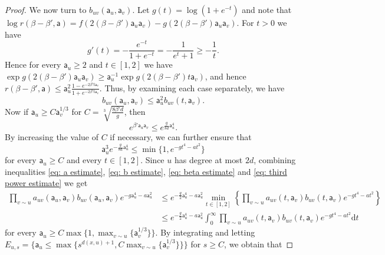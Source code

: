 \documentclass[10pt,a4paper]{amsart}
\begin{document}
\begin{proof}
We now turn to $b_{uv}(\mathsf{a}_u,\mathsf{a}_v)$. Let $g(t)=\log(1+e^{-t})$ and note that $\log r(\beta-\beta',\mathsf{a})=f(2(\beta-\beta')\mathsf{a}_u \mathsf{a}_v)-g(2(\beta-\beta')\mathsf{a}_u \mathsf{a}_v)$.
For $t>0$ we have
\begin{equation}
g'(t)=-\frac{e^{-t}}{1+e^{-t}}=-\frac{1}{e^t+1}\geq -\frac{1}{t}.   
\end{equation}
Hence for every $\mathsf{a}_u\geq 2$ and $t\in [1,2]$ we have 
$\exp g(2(\beta-\beta')\mathsf{a}_u \mathsf{a}_v)\geq \mathsf{a}_u^{-1} \exp g(2(\beta-\beta')t \mathsf{a}_v)$, and hence $r(\beta-\beta',\mathsf{a}) \leq \mathsf a_u^2 \frac{1-e^{-2\beta' t \mathsf a_v}}{1+e^{-2\beta' t \mathsf a_v}}.$
Thus, by examining each case separately, we have
\begin{equation}\label{eq: b estimate}
b_{uv}(\mathsf{a}_u,\mathsf{a}_v)\leq \mathsf{a}_u^2 b_{uv}(t,\mathsf{a}_v).    
\end{equation}
Now if $\mathsf{a}_u\geq C\mathsf{a}_v^{1/3}$ for $C=\sqrt[3]{\frac{8\beta' d}{g}}$, then
\begin{equation}\label{eq: beta estimate}
e^{\beta' \mathsf{a}_u \mathsf{a}_v}\leq e^{\frac{g}{8d}\mathsf{a}_u^4}.    
\end{equation}
By increasing the value of $C$ if necessary, we can further ensure that 
\begin{equation}\label{eq: third power estimate}
\mathsf{a}_u^3 e^{-\frac{g}{8d}\mathsf{a}_u^4}\leq \min\{1,e^{-gt^4-at^2} \}    
\end{equation}
for every $\mathsf{a}_u\geq C$ and every $t\in [1,2]$. Since $u$ has degree at most $2d$, combining inequalities \eqref{eq: a estimate}, \eqref{eq: b estimate}, \eqref{eq: beta estimate} and \eqref{eq: third power estimate} we get
\begin{equation}
\begin{aligned}
\prod_{v\sim u} a_{uv}(\mathsf{a}_u,\mathsf{a}_v)b_{uv}(\mathsf{a}_u,\mathsf{a}_v)e^{-g\mathsf{a}_u^4-a\mathsf{a}_u^2}&\leq e^{-\frac{g}{2}\mathsf{a}_u^4-a\mathsf{a}_u^2}\min_{t\in [1,2]}\left\{\prod_{v \sim u} a_{uv}(t,\mathsf{a}_v) b_{uv}(t,\mathsf{a}_v) e^{-gt^4-at^2}\right\} \\
&\leq   e^{-\frac{g}{2}\mathsf{a}_u^4-a\mathsf{a}_u^2} \int_0^\infty \prod_{v \sim u} a_{uv}(t,\mathsf{a}_v)  b_{uv}(t,\mathsf{a}_v) e^{-gt^4-at^2}\mathrm{d} t  
\end{aligned}
\end{equation}
for every $\mathsf{a}_u\geq C\max\{1,\max_{v\sim u}\{\mathsf{a}_v^{1/3}\}\}$.
By integrating and letting $E_{u,s}=\{\mathsf{a}_u\leq \max\{s^{d(x,u)+1},C\max_{v\sim u}\{\mathsf{a}_v^{1/3}\}\}\}$ for $s\geq C$, we obtain that 

\end{proof}
\end{document}
